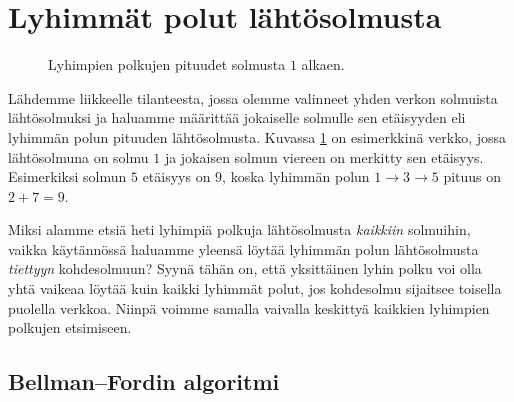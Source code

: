 \section{Lyhimmät polut lähtösolmusta}

\begin{figure}
\center
\begin{center}
\end{center}
\caption{Lyhimpien polkujen pituudet solmusta $1$ alkaen.}
\label{fig:lypola}
\end{figure}

Lähdemme liikkeelle tilanteesta, jossa olemme valinneet yhden verkon
solmuista lähtösolmuksi ja haluamme määrittää
jokaiselle solmulle sen etäisyy\-den
eli lyhimmän polun pituuden lähtösolmusta.
Kuvassa \ref{fig:lypola} on esimerkkinä verkko,
jossa lähtösolmuna on solmu $1$ ja jokaisen solmun
viereen on merkitty sen etäisyys.
Esimerkiksi solmun $5$ etäisyys on $9$,
koska lyhimmän polun $1 \rightarrow 3 \rightarrow 5$ pituus on $2+7=9$.

Miksi alamme etsiä heti lyhimpiä polkuja lähtösolmusta
\emph{kaikkiin} solmuihin, vaikka käytännössä haluamme yleensä
löytää lyhimmän polun lähtö\-solmusta \emph{tiettyyn} kohdesolmuun?
Syynä tähän on, että yksittäinen lyhin polku voi olla
yhtä vaikeaa löytää kuin kaikki lyhimmät polut,
jos kohdesolmu sijaitsee toisella puolella verkkoa.
Niinpä voimme samalla vaivalla keskittyä kaikkien lyhimpien
polkujen etsimiseen.

\subsection{Bellman–Fordin algoritmi}

